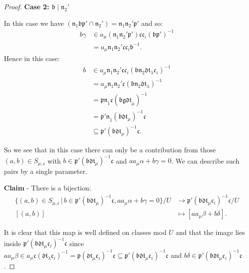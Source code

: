 \documentclass[a4paper,oneside]{amsart}
\theoremstyle{plain}
\theoremstyle{definition}
\begin{document}
\begin{proof}
\vspace{0.2in}
\textbf{Case 2: $\mathfrak{b}\mid\mathfrak{n}_2'$} 

\vspace{0.1in}
In this case we have $(\mathfrak{n}_1\mathfrak{bp'}\cap\mathfrak{n}_2') = \mathfrak{n}_1\mathfrak{n}_2'\mathfrak{p'}$ and so: \begin{align*}b\gamma &\in a_{\mu}(\mathfrak{n}_1\mathfrak{n}_2'\mathfrak{p'})\mathfrak{cc}_i(\mathfrak{bp'})^{-1}\\ &= a_{\mu}\mathfrak{n}_1\mathfrak{n}_2'\mathfrak{cc}_i\mathfrak{b}^{-1}.\end{align*} Hence in this case: \begin{align*}b &\in a_{\mu}\mathfrak{n}_1\mathfrak{n}_2'\mathfrak{cc}_i(\mathfrak{bn}_2\mathfrak{dt}_{\lambda}\mathfrak{c}_i)^{-1}\\ &= a_{\mu}\mathfrak{n}_1\mathfrak{n}_2'\mathfrak{c}(\mathfrak{bn}_2\mathfrak{dt}_{\lambda})^{-1}\\ &= \mathfrak{pn}_1\mathfrak{c}(\mathfrak{bgdt}_{\mu})^{-1}\\ &= \mathfrak{p'n}_1(\mathfrak{bdt}_{\mu})^{-1}\mathfrak{c}\\ &\subseteq \mathfrak{p'}(\mathfrak{bdt}_{\mu})^{-1}\mathfrak{c}.\end{align*}

So we see that in this case there can only be a contribution from those $(a,b)\in S_{\mu,\mathfrak{c}}$ with $b\in\mathfrak{p'}(\mathfrak{bdt}_{\mu})^{-1}\mathfrak{c}$ and $aa_{\mu}\alpha+b\gamma = 0$. We can describe such pairs by a single parameter.

\vspace{0.2in}
\textbf{Claim} - There is a bijection: \begin{align*}\{(a,b)\in S_{\mu,\mathfrak{c}}\,|\,b\in \mathfrak{p'}(\mathfrak{bdt}_{\mu})^{-1}\mathfrak{c}, aa_{\mu}\alpha+b\gamma = 0\}/U &\longrightarrow \mathfrak{p'}(\mathfrak{bdt}_{\mu}\mathfrak{c}_i)^{-1}\mathfrak{c}/U\\ [(a,b)] &\longmapsto [aa_{\mu}\beta + b\delta].\end{align*}

It is clear that this map is well defined on classes mod $U$ and that the image lies inside $\mathfrak{p'}(\mathfrak{bdt}_{\mu}\mathfrak{c}_i)^{-1}\mathfrak{c}$ since $aa_{\mu}\beta\in a_{\mu}\mathfrak{c}(\mathfrak{dt}_{\lambda}\mathfrak{c}_i)^{-1} = \mathfrak{p}(\mathfrak{dt}_{\mu}\mathfrak{c}_i)^{-1}\mathfrak{c} \subseteq \mathfrak{p'}(\mathfrak{bdt}_{\mu}\mathfrak{c}_i)^{-1}\mathfrak{c}$ and $b\delta\in \mathfrak{p'}(\mathfrak{bdt}_{\mu}\mathfrak{c}_i)^{-1}\mathfrak{c}$.


\end{proof}
\end{document}
